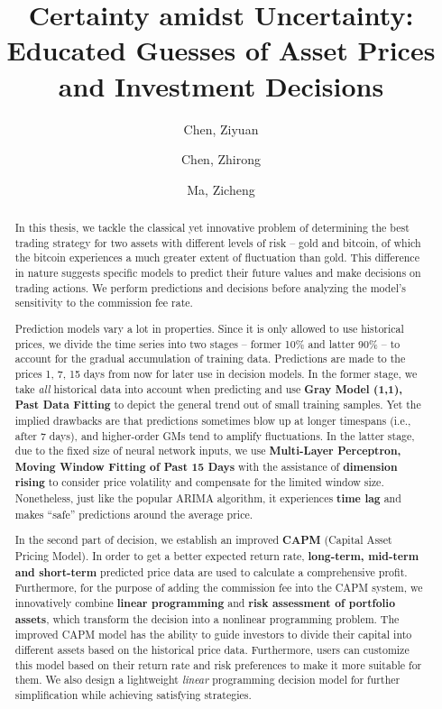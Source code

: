 \documentclass{mcmthesis}
\title{\textbf{Certainty amidst Uncertainty: Educated Guesses of Asset Prices and Investment Decisions}}
\author{Chen, Ziyuan \and Chen, Zhirong \and Ma, Zicheng}
\begin{document}
	\begin{abstract}
		
		In this thesis, we tackle the classical yet innovative problem of determining the best trading strategy for two assets with different levels of risk -- gold and bitcoin, of which the bitcoin experiences a much greater extent of fluctuation than gold. This difference in nature suggests specific models to predict their future values and make decisions on trading actions. We perform predictions and decisions before analyzing the model's sensitivity to the commission fee rate. 
		
		Prediction models vary a lot in properties. Since it is only allowed to use historical prices, we divide the time series into two stages -- former 10\% and latter 90\% -- to account for the gradual accumulation of training data. Predictions are made to the prices 1, 7, 15 days from now for later use in decision models. In the former stage, we take \textit{all} historical data into account when predicting and use \textbf{Gray Model (1,1), Past Data Fitting} to depict the general trend out of small training samples. Yet the implied drawbacks are that predictions sometimes blow up at longer timespans (i.e., after 7 days), and higher-order GMs tend to amplify fluctuations. In the latter stage, due to the fixed size of neural network inputs, we use \textbf{Multi-Layer Perceptron, Moving Window Fitting of Past 15 Days} with the assistance of \textbf{dimension rising} to consider price volatility and compensate for the limited window size. Nonetheless, just like the popular ARIMA algorithm, it experiences \textbf{time lag} and makes ``safe'' predictions around the average price. 
		
		In the second part of decision, we establish an improved \textbf{CAPM} (Capital Asset Pricing Model). In order to get a better expected return rate, \textbf{long-term, mid-term and short-term} predicted price data are used to calculate a comprehensive profit. Furthermore, for the purpose of adding the commission fee into the CAPM system, we innovatively combine \textbf{linear programming} and \textbf{risk assessment of portfolio assets}, which transform the decision into a nonlinear programming problem. The improved CAPM model has the ability to guide investors to divide their capital into different assets based on the historical price data. Furthermore, users can customize this model based on their return rate and risk preferences to make it more suitable for them. We also design a lightweight \textit{linear} programming decision model for further simplification while achieving satisfying strategies. 
		

\end{abstract}
\end{document}
